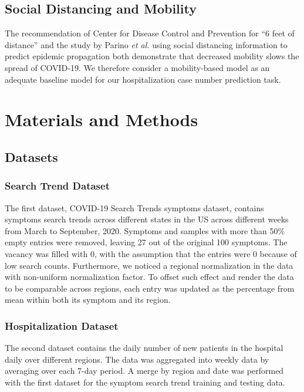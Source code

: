 \documentclass[12pt]{article}
\begin{document}
\subsection{Social Distancing and Mobility}
The recommendation of Center for Disease Control and Prevention for “6 feet of distance”\cite{cdc} and the study by Parino \textit{et al.} \cite{parino2020modelling} using social distancing information to predict epidemic propagation both demonstrate that decreased mobility slows the spread of COVID-19. We therefore consider a mobility-based model as an adequate baseline model for our hospitalization case number prediction task.

\section{Materials and Methods}

\subsection{Datasets}

\subsubsection{Search Trend Dataset}
The first dataset, COVID-19 Search Trends symptoms dataset\cite{ds1}, contains symptoms search trends across different states in the US across different weeks from March to September, 2020. Symptoms and samples with more than 50\% empty entries were removed, leaving 27 out of the original 100 symptoms. The vacancy was filled with 0, with the assumption that the entries were 0 because of low search counts. Furthermore, we noticed a regional normalization in the data with non-uniform normalization factor. To offset such effect and render the data to be comparable across regions, each entry was updated as the percentage from mean within both its symptom and its region.

\subsubsection{Hospitalization Dataset}
The second dataset\cite{ds2} contains the daily number of new patients in the hospital daily over different regions. The data was aggregated into weekly data by averaging over each 7-day period. A merge by region and date was performed with the first dataset for the symptom search trend training and testing data.
 
\end{document}
